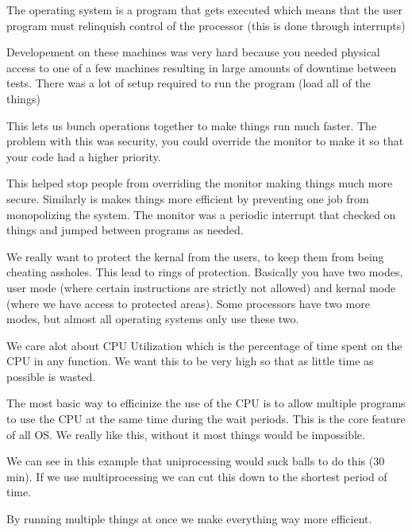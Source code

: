\documentclass[12pt]{article}
\begin{document}








The operating system is a program that gets executed which means that the user program must relinquish control of the processor (this is done through interrupts)





Developement on these machines was very hard because you needed physical access to one of a few machines resulting in large amounts of downtime between tests. There was a lot of setup required to run the program (load all of the things)

This lets us bunch operations together to make things run much faster. The problem with this was security, you could override the monitor to make it so that your code had a higher priority.


This helped stop people from overriding the monitor making things much more secure. Similarly is makes things more efficient by preventing one job from monopolizing the system. The monitor was a periodic interrupt that checked on things and jumped between programs as needed.


We really want to protect the kernal from the users, to keep them from being cheating assholes. This lead to rings of protection. Basically you have two modes, user mode (where certain instructions are strictly not allowed) and kernal mode (where we have access to protected areas). Some processors have two more modes, but almost all operating systems only use these two.

We care alot about CPU Utilization which is the percentage of time spent on the CPU in any function. We want this to be very high so that as little time as possible is wasted.


The most basic way to efficinize the use of the CPU is to allow multiple programs to use the CPU at the same time during the wait periods. This is the core feature of all OS. We really like this, without it most things would be impossible.



We can see in this example that uniprocessing would suck balls to do this (30 min). If we use multiprocessing we can cut this down to the shortest period of time.

By running multiple things at once we make everything way more efficient.
\end{document}
